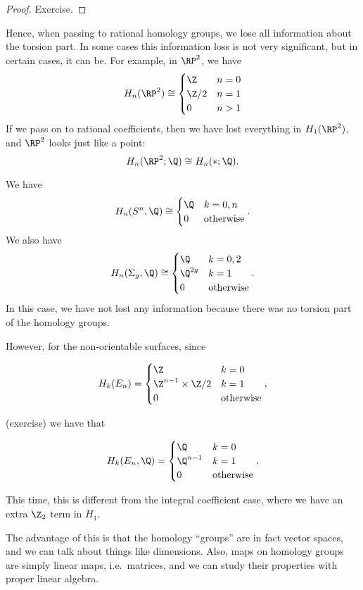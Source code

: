 \documentclass[a4paper]{article}
\begin{document}
\begin{proof}
  Exercise. %
\end{proof}
Hence, when passing to rational homology groups, we lose all information about the torsion part. In some cases this information loss is not very significant, but in certain cases, it can be. For example, in $\RP^2$, we have
\[
  H_n(\RP^2) \cong
  \begin{cases}
    \Z & n = 0\\
    \Z/2 & n = 1\\
    0 & n > 1
  \end{cases}
\]
If we pass on to rational coefficients, then we have lost everything in $H_1(\RP^2)$, and $\RP^2$ looks just like a point:
\[
  H_n(\RP^2; \Q) \cong H_n(*; \Q).
\]
\begin{eg}
  We have
  \[
    H_n(S^n, \Q) \cong
    \begin{cases}
      \Q & k = 0, n\\
      0 & \text{otherwise}
    \end{cases}.
  \]
  We also have
  \[
    H_n(\Sigma_g, \Q) \cong
    \begin{cases}
      \Q & k = 0, 2\\
      \Q^{2g} & k = 1\\
      0 & \text{otherwise}
    \end{cases}.
  \]
  In this case, we have not lost any information because there was no torsion part of the homology groups.

  However, for the non-orientable surfaces, since
  
   \[
    H_k(E_n) =
    \begin{cases}
      \Z & k = 0\\
      \Z^{n - 1} \times \Z / 2 & k = 1\\
      0 & \text{otherwise}
    \end{cases},
  \] 

  (exercise) we have that

  \[
    H_k(E_n, \Q) =
    \begin{cases}
      \Q & k = 0\\
      \Q^{n - 1} & k = 1\\
      0 & \text{otherwise}
    \end{cases},
  \]

  This time, this is different from the integral coefficient case, where we have an extra $\Z_2$ term in $H_1$.
\end{eg}

The advantage of this is that the homology ``groups'' are in fact vector spaces, and we can talk about things like dimensions. Also, maps on homology groups are simply linear maps, i.e.\ matrices, and we can study their properties with proper linear algebra.
\end{document}
